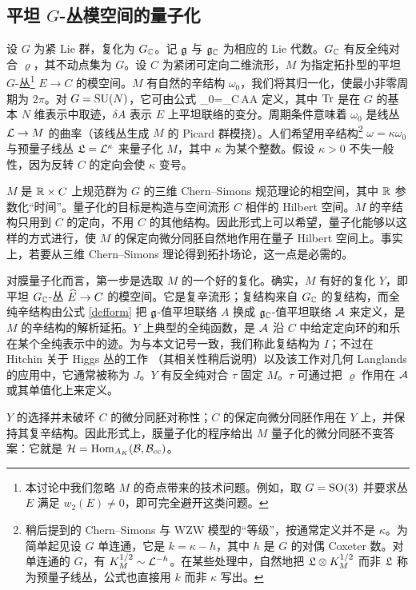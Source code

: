 \subsection{平坦 $G$-丛模空间的量子化}\label{flatg}

设 $G$ 为紧 Lie 群，复化为 $G_{\mathbb C}$。记 ${\mathfrak g}$ 与 ${\mathfrak g}_{\mathbb C}$ 为相应的 Lie 代数。$G_{\mathbb C}$ 有反全纯对合 $\varrho$，其不动点集为 $G$。设 $C$ 为紧闭可定向二维流形，$M$ 为指定拓扑型的平坦 $G$-丛\footnote{本讨论中我们忽略 $M$ 的奇点带来的技术问题。例如，取 $G={\mathrm{SO}}(3)$ 并要求丛 $E$ 满足 $w_2(E)\ne0$，即可完全避开这类问题。} $E\to C$ 的模空间。$M$ 有自然的辛结构 $\omega_0$，我们将其归一化，使最小非零周期为 $2\pi$。对 $G={\mathrm{SU}}(N)$，它可由公式 \cite{ABott}
\be\label{defform}\omega_0=\int_C\Tr\,\delta A\wedge\delta A\ee
定义，其中 ${\rm Tr}$ 是在 $G$ 的基本 $N$ 维表示中取迹，$\delta A$ 表示 $E$ 上平坦联络的变分。周期条件意味着 $\omega_0$ 是线丛 ${\mathcal L}\to M$ 的曲率（该线丛生成 $M$ 的 Picard 群模挠）。人们希望用辛结构\footnote{稍后提到的 Chern--Simons 与 WZW 模型的“等级”，按通常定义并不是 $\kappa$。为简单起见设 $G$ 单连通，它是 $k=\kappa-h$，其中 $h$ 是 $G$ 的对偶 Coxeter 数。对单连通的 $G$，有 $K_M^{1/2}\sim{\mathcal L}^{-h}$。在某些处理中，自然地把 ${\mathfrak L}\otimes K_M^{1/2}$ 而非 ${\mathfrak L}$ 称为预量子线丛，公式也直接用 $k$ 而非 $\kappa$ 写出。}
$\omega=\kappa\omega_0$ 与预量子线丛 ${\mathfrak L}={\mathcal L}^\kappa$ 来量子化 $M$，其中 $\kappa$ 为某个整数。假设 $\kappa>0$ 不失一般性，因为反转 $C$ 的定向会使 $\kappa$ 变号。

$M$ 是 ${\mathbb R}\times C$ 上规范群为 $G$ 的三维 Chern--Simons 规范理论的相空间，其中 ${\mathbb R}$ 参数化“时间”\cite{WittenJ}。量子化的目标是构造与空间流形 $C$ 相伴的 Hilbert 空间。$M$ 的辛结构只用到 $C$ 的定向，不用 $C$ 的其他结构。因此形式上可以希望，量子化能够以这样的方式进行，使 $M$ 的保定向微分同胚自然地作用在量子 Hilbert 空间上。事实上，若要从三维 Chern--Simons 理论得到拓扑场论，这一点是必需的。

对膜量子化而言，第一步是选取 $M$ 的一个好的复化。确实，$M$ 有好的复化 $Y$，即平坦 $G_{\mathbb C}$-丛 $\widehat E\to C$ 的模空间。它是复辛流形；复结构来自 $G_{\mathbb C}$ 的复结构，而全纯辛结构由公式 \eqref{defform} 把 ${\mathfrak g}$-值平坦联络 $A$ 换成 ${\mathfrak g}_{\mathbb C}$-值平坦联络 ${\mathcal A}$ 来定义，是 $M$ 的辛结构的解析延拓。$Y$ 上典型的全纯函数，是 ${\mathcal A}$ 沿 $C$ 中给定定向环的和乐在某个全纯表示中的迹。为与本文记号一致，我们称此复结构为 $I$；不过在 Hitchin 关于 Higgs 丛的工作 \cite{Hitchin}（其相关性稍后说明）以及该工作对几何 Langlands 的应用中，它通常被称为 $J$。$Y$ 有反全纯对合 $\tau$ 固定 $M$。$\tau$ 可通过把 $\varrho$ 作用在 ${\mathcal A}$ 或其单值化上来定义。

$Y$ 的选择并未破坏 $C$ 的微分同胚对称性；$C$ 的保定向微分同胚作用在 $Y$ 上，并保持其复辛结构。因此形式上，膜量子化的程序给出 $M$ 量子化的微分同胚不变答案：它就是 ${\mathcal H}={\mathrm{Hom}}_{A_K}({\mathcal B},{\mathcal B}_{\mathrm{cc}})$。

